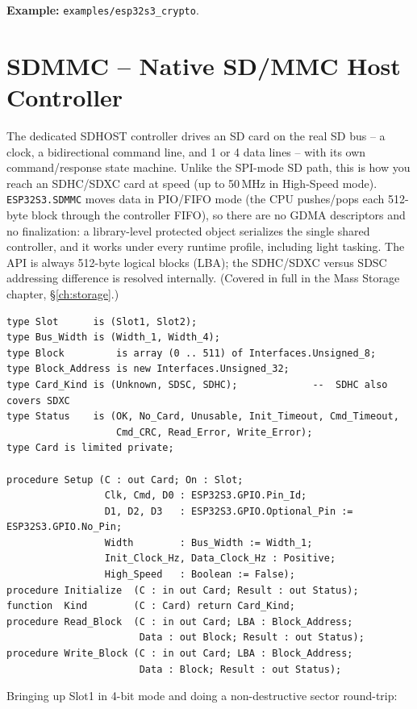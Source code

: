 \noindent\textbf{Example:} \texttt{examples/esp32s3\_crypto}.

\section{SDMMC -- Native SD/MMC Host Controller}
\label{app:int:sdmmc}

The dedicated SDHOST controller drives an SD card on the real SD bus -- a clock,
a bidirectional command line, and 1 or 4 data lines -- with its own
command/response state machine. Unlike the SPI-mode SD path, this is how you reach
an SDHC/SDXC card at speed (up to 50\,MHz in High-Speed mode).
\texttt{ESP32S3.SDMMC} moves data in PIO/FIFO mode (the CPU pushes/pops each
512-byte block through the controller FIFO), so there are no GDMA descriptors and
no finalization: a library-level protected object serializes the single shared
controller, and it works under every runtime profile, including light tasking. The
API is always 512-byte logical blocks (LBA); the SDHC/SDXC versus SDSC addressing
difference is resolved internally. (Covered in full in the Mass Storage chapter,
\S\ref{ch:storage}.)

\begin{lstlisting}
type Slot      is (Slot1, Slot2);
type Bus_Width is (Width_1, Width_4);
type Block         is array (0 .. 511) of Interfaces.Unsigned_8;
type Block_Address is new Interfaces.Unsigned_32;
type Card_Kind is (Unknown, SDSC, SDHC);             --  SDHC also covers SDXC
type Status    is (OK, No_Card, Unusable, Init_Timeout, Cmd_Timeout,
                   Cmd_CRC, Read_Error, Write_Error);
type Card is limited private;

procedure Setup (C : out Card; On : Slot;
                 Clk, Cmd, D0 : ESP32S3.GPIO.Pin_Id;
                 D1, D2, D3   : ESP32S3.GPIO.Optional_Pin := ESP32S3.GPIO.No_Pin;
                 Width        : Bus_Width := Width_1;
                 Init_Clock_Hz, Data_Clock_Hz : Positive;
                 High_Speed   : Boolean := False);
procedure Initialize  (C : in out Card; Result : out Status);
function  Kind        (C : Card) return Card_Kind;
procedure Read_Block  (C : in out Card; LBA : Block_Address;
                       Data : out Block; Result : out Status);
procedure Write_Block (C : in out Card; LBA : Block_Address;
                       Data : Block; Result : out Status);
\end{lstlisting}

Bringing up Slot1 in 4-bit mode and doing a non-destructive sector round-trip:

